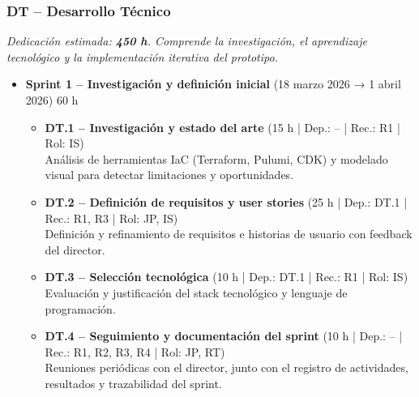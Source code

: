 \documentclass{article}
\begin{document}
{        \subsubsection{DT – Desarrollo Técnico}
        \textit{Dedicación estimada: \textbf{450 h}. Comprende la investigación, el
        aprendizaje tecnológico y la implementación iterativa del prototipo.}
        
        \begin{itemize}[leftmargin=*, itemsep=2pt]
        
                \item \textbf{Sprint 1 – Investigación y definición inicial} 
        (18 marzo 2026 → 1 abril 2026) 60 h
        
            \begin{itemize}[leftmargin=1.2em, itemsep=2pt]
        
                \item \textbf{DT.1 – Investigación y estado del arte} 
                (15 h | Dep.: -- | Rec.: R1 | Rol: IS) \\
                Análisis de herramientas IaC (Terraform, Pulumi, CDK) y modelado visual 
                para detectar limitaciones y oportunidades.
        
                \item \textbf{DT.2 – Definición de requisitos y user stories} 
                (25 h | Dep.: DT.1 | Rec.: R1, R3 | Rol: JP, IS) \\
                Definición y refinamiento de requisitos e historias de usuario con 
                feedback del director.
        
                \item \textbf{DT.3 – Selección tecnológica} 
                (10 h | Dep.: DT.1 | Rec.: R1 | Rol: IS) \\
                Evaluación y justificación del stack tecnológico y lenguaje de 
                programación.
        
                \item \textbf{DT.4 – Seguimiento y documentación del sprint} 
                (10 h | Dep.: -- | Rec.: R1, R2, R3, R4 | Rol: JP, RT) \\
                Reuniones periódicas con el director, junto con el registro de 
                actividades, resultados y trazabilidad del sprint.
        
            \end{itemize}
        

\end{itemize}}
\end{document}
